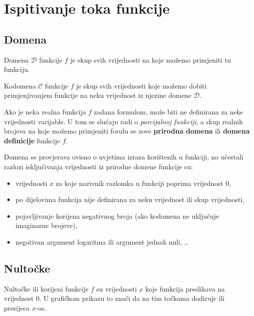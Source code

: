 \section{Ispitivanje toka funkcije}

\subsection{Domena}

\begin{definition}
    Domena $\mathcal{D}$ funkcije $f$ je skup svih vrijednosti na koje možemo
    primjeniti tu funkciju.
\end{definition}

\begin{definition}
    Kodomena $\mathcal{C}$ funkcije $f$ je skup svih vrijednosti koje možemo
    dobiti primjenjivanjem funkcije na neku vrijednost iz njezine domene
    $\mathcal{D}$.
\end{definition}

Ako je neka realna funkcija $f$ zadana formulom, može biti ne definirana za neke
vrijednosti varijable. U tom se slučaju radi o \textit{parcijalnoj funkciji}, a
skup realnih brojeva na koje možemo primjeniti forulu se zove \textbf{prirodna
domena} ili \textbf{domena definicije} funkcije $f$.

\bigskip
\noindent
Domena se provjerava ovisno o uvjetima izraza korištenih u funkciji, no učestali
razlozi isključivanja vrijednosti iz prirodne domene funkcije su:
\begin{itemize}
    \item vrijednosti $x$ za koje nazivnik razlomka u funkciji poprima vrijednost $0$,
    \item po dijelovima funkcija nije definirana za neku vrijednost ili skup vrijednosti,
    \item pojavljivanje korijena negativnog broja (ako kodomena ne uključuje imaginarne brojeve),
    \item negativan argument logaritma ili argument jednak nuli, \dots
\end{itemize}

\subsection{Nultočke}

Nultočke ili korijeni funkcije $f$ su vrijednosti $x$ koje funkcija preslikava
na vrijednost $0$. U grafičkom prikazu to znači da na tim točkama dodiruje ili
presijeca $x$-os.

